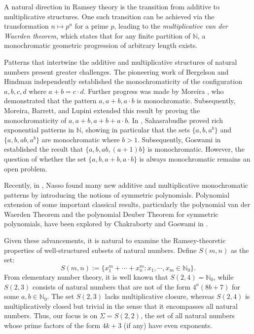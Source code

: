 \documentclass[12pt]{amsart}
\theoremstyle{plain}
\theoremstyle{definition}
\theoremstyle{remark}
\numberwithin{equation}{section}
\begin{document}
A natural direction in Ramsey theory is the transition from additive to multiplicative structures. One such transition can be achieved via the transformation $n \mapsto p^n$ for a prime $p$, leading to the \emph{multiplicative van der Waerden theorem}, which states that for any finite partition of $\mathbb{N}$, a monochromatic geometric progression of arbitrary length exists.

Patterns that intertwine the additive and multiplicative structures of natural numbers present greater challenges. The pioneering work of Bergelson \cite{Ber10} and Hindman \cite{Hind11} independently established the monochromaticity of the configuration ${a, b, c, d}$ where $a + b = c \cdot d$. Further progress was made by Moreira \cite{Joel17}, who demonstrated that the pattern ${a, a + b, a \cdot b}$ is monochromatic. Subsequently, Moreira, Barrett, and Lupini \cite{BLM21} extended this result by proving the monochromaticity of ${a, a + b, a + b + a \cdot b}$. In \cite{Saha18}, Sahasrabudhe proved rich exponential patterns in $\mathbb{N}$, showing in particular that the sets $\{a,b, a^b \}$ and $\{a,b, ab, a^b\}$ are monochromatic where $b >1$. Subsequently, Goswami in \cite{G25} established the result that $\{a, b, ab, (a+1)b\}$ is monochromatic. However, the question of whether the set $\{a, b, a + b, a \cdot b\}$ is always monochromatic remains an open problem.

Recently, in \cite{Nasso22}, Nasso found many new additive and multiplicative monochromatic patterns by introducing the notions of symmetric polynomials. Polynomial extension of some important classical results, particularly the polynomial van der Waerden Theorem and the polynomial Deuber Theorem for symmetric polynomials, have been explored by Chakraborty and Goswami in \cite{CG24}.



Given these advancements, it is natural to examine the Ramsey-theoretic properties of well-structured subsets of natural numbers. Define $S(m,n)$ as the set:
$$
S(m,n):=\{x_1^m+\cdots + x_n^m: x_1, \cdots, x_m \in \mathbb{N}_0\}.
$$
From elementary number theory, it is well known that $S(2,4) = \mathbb{N}_0$, while $S(2,3)$ consists of natural numbers that are not of the form $4^a(8b+7)$ for some $a, b \in \mathbb{N}_0$. The set $S(2,3)$ lacks multiplicative closure, whereas $S(2,4)$ is multiplicatively closed but trivial in the sense that it encompasses all natural numbers. Thus, our focus is on $\Sigma = S(2,2)$, the set of all natural numbers whose prime factors of the form $4k+3$ (if any) have even exponents. 
\end{document}
